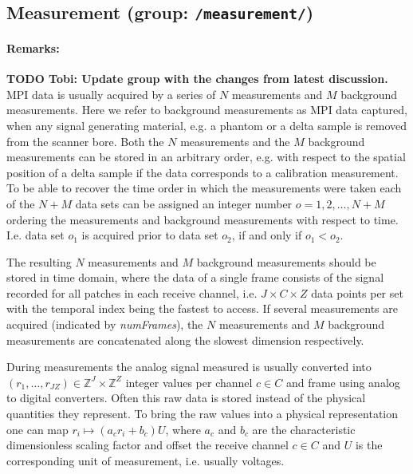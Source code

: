 \documentclass[landscape,a4paper]{article} %
\newcommand{\inl}[1]{\lstinline[columns=fixed]{#1}}
\begin{document}
\subsection{Measurement (group: \inl{/measurement/})}
\begin{multicols}{2}

\paragraph{Remarks:}
\textbf{TODO Tobi: Update group with the changes from latest discussion.}
MPI data is usually acquired by a series of $N$ measurements and $M$ background measurements. Here we refer to background measurements as MPI data captured, when any signal generating material, e.g. a phantom or a delta sample is removed from the scanner bore. Both the $N$ measurements and the $M$ background measurements can be stored in an arbitrary order, e.g. with respect to the spatial position of a delta sample if the data corresponds to a calibration measurement. To be able to recover the time order in which the measurements were taken each of the $N+M$ data sets can be assigned an integer number $o = 1,2,\dots,N+M$ ordering the measurements and background measurements with respect to time. I.e. data set $o_1$ is acquired prior to data set $o_2$, if and only if $o_1 < o_2$.

The resulting $N$ measurements and $M$ background measurements should be stored in time domain, where the data of a single frame consists of the signal recorded for all patches in each receive channel, i.e. $J \times C \times Z$ data points per set with the temporal index being the fastest to access. If several measurements are acquired (indicated by \textit{numFrames}), the $N$ measurements and $M$ background measurements are concatenated along the slowest dimension respectively.

During measurements the analog signal measured is usually converted into $(r_1,\dots,r_{JZ}) \in \mathbb Z^J \times \mathbb Z^Z$ integer values per channel $c \in C$ and frame using analog to digital converters. Often this raw data is stored instead of the physical quantities they represent. To bring the raw values into a physical representation one can map $r_i \mapsto (a_c r_i + b_c) U$, where $a_c$ and $b_c$ are the characteristic dimensionless scaling factor and offset the receive channel $c \in C$ and $U$ is the corresponding unit of measurement, i.e. usually voltages.
\end{multicols}
\end{document}
